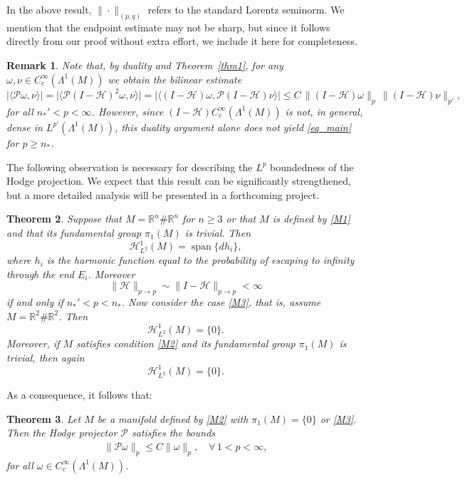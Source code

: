 \documentclass[12pt]{amsart}
\newtheorem{theorem}{Theorem}[section]
\newtheorem{remark}[theorem]{Remark}
\begin{document}
In the above result, $\|\cdot\|_{(p,q)}$ refers to the standard Lorentz seminorm. We mention that the endpoint estimate may not be sharp, but since it follows directly from our proof without extra effort, we include it here for completeness.

\begin{remark}
Note that, by duality and Theorem~\ref{thm1}, for any \(\omega,\nu\in C_c^\infty(\Lambda^1(M))\) we obtain the bilinear estimate
\[
\bigl|\langle \mathcal{P}\omega,\nu\rangle\bigr|
= \bigl|\langle \mathcal{P}(I-\mathcal{H})^{2}\omega,\nu\rangle\bigr|
= \bigl|\langle (I-\mathcal{H})\omega,\mathcal{P}(I-\mathcal{H})\nu\rangle\bigr|
\le C\,\|(I-\mathcal{H})\omega\|_{p}\,\|(I-\mathcal{H})\nu\|_{p'},
\]
for all \(n_*'<p<\infty\).
However, since \((I-\mathcal{H})C_c^\infty(\Lambda^1(M))\) is not, in general, dense in \(L^{p'}(\Lambda^1(M))\), this duality argument alone does not yield \eqref{eq_main} for \(p\ge n_*\).
\end{remark}

The following observation is necessary for describing the $L^p$ boundedness of the Hodge projection. We expect that this result can be significantly strengthened, but a more detailed analysis will be presented in a forthcoming project.

\begin{theorem}\label{thm0}
Suppose that 
$M = \mathbb{R}^{n} \# \mathbb{R}^{n}$ for $n\ge 3$ or that $M$ is defined by \eqref{M1} and that its fundamental group $\pi_1(M)$ is trivial. Then
\[
\mathcal{H}_{L^2}^1(M) = \operatorname{span} \{d h_i\},
\]
where $h_i$ is the harmonic function equal to the probability of escaping to infinity through the end $E_i$.
Moreover 
$$
\|\mathcal{H}\|_{p \to p}\sim \|I-\mathcal{H}\|_{p \to p} < \infty 
$$
if and only if $n_*'<p < n_*$.
Now consider the case \eqref{M3}, that is, assume $M = \mathbb{R}^2 \# \mathbb{R}^2$. Then
\[
\mathcal{H}_{L^2}^1(M) = \{0\}.
\]
Moreover, if $M$ satisfies condition \eqref{M2} and its fundamental group $\pi_1(M)$ is trivial, then again
\[
\mathcal{H}_{L^2}^1(M) = \{0\}.
\]
\end{theorem}





As a consequence, it follows that:

\begin{theorem}\label{thm2}
Let $M$ be a manifold defined by \eqref{M2} with $\pi_1(M) = \{0\}$ or \eqref{M3}. Then the Hodge projector $\mathcal{P}$ satisfies the bounds
\begin{align}
    \|\mathcal{P}\omega\|_p \le C \|\omega\|_p, \quad \forall\, 1<p<\infty,
\end{align}
for all $\omega \in C_c^\infty(\Lambda^1(M))$.
\end{theorem}
\end{document}
